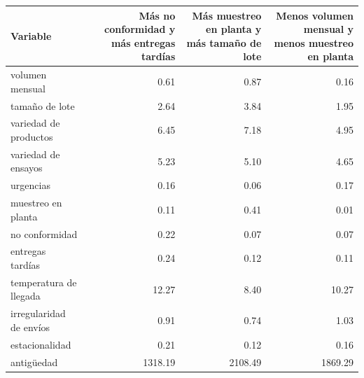 \begin{tabular}{lrrr}
\toprule
Variable & Más no conformidad y más entregas tardías & Más muestreo en planta y más tamaño de lote & Menos volumen mensual y menos muestreo en planta \\
\midrule
volumen mensual & 0.61 & 0.87 & 0.16 \\
tamaño de lote & 2.64 & 3.84 & 1.95 \\
variedad de productos & 6.45 & 7.18 & 4.95 \\
variedad de ensayos & 5.23 & 5.10 & 4.65 \\
urgencias & 0.16 & 0.06 & 0.17 \\
muestreo en planta & 0.11 & 0.41 & 0.01 \\
no conformidad & 0.22 & 0.07 & 0.07 \\
entregas tardías & 0.24 & 0.12 & 0.11 \\
temperatura de llegada & 12.27 & 8.40 & 10.27 \\
irregularidad de envíos & 0.91 & 0.74 & 1.03 \\
estacionalidad & 0.21 & 0.12 & 0.16 \\
antigüedad & 1318.19 & 2108.49 & 1869.29 \\
\bottomrule
\end{tabular}
